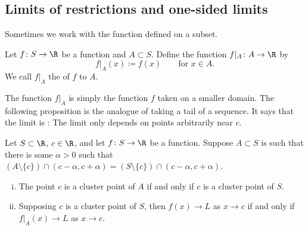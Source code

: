 \subsection{Limits of restrictions and one-sided limits}

Sometimes we work with the function defined on a subset.

\begin{defn}
Let $f \colon S \to \R$ be a function and $A \subset S$.  Define the
function $f|_A \colon A \to \R$ by
\begin{equation*}
f|_A (x) \coloneqq f(x)  \qquad \text{for } x \in A.
\end{equation*}
We call $f|_A$ the \emph{} of $f$ to $A$.
\end{defn}

The function $f|_A$ is simply the function $f$ taken on a smaller domain.
The following proposition is the analogue of taking a tail of a sequence.
It says that the limit is : The limit only depends on points
arbitrarily near $c$.

\begin{prop} \label{prop:limrest}
Let $S \subset \R$, $c \in \R$, and
let $f \colon S
\to \R$ be a function.
Suppose
$A \subset S$ is such that there is some $\alpha > 0$ such that
$(A \setminus \{ c \}) \cap (c-\alpha,c+\alpha) = (S \setminus \{ c \}) \cap (c-\alpha,c+\alpha)$.
\begin{enumerate}[(i)]
\item The point $c$ is a cluster point of $A$ if and only if $c$ is a cluster point
of $S$.
\item Supposing $c$ is a cluster point of $S$, then $f(x) \to L$ as $x \to c$ if and only if
$f|_A(x) \to L$ as $x \to c$.
\end{enumerate}
\end{prop}

